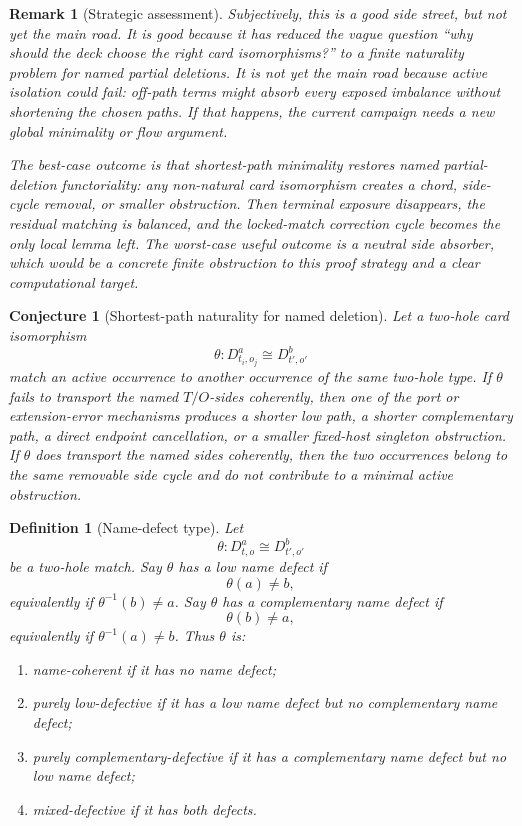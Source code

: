 \documentclass[11pt]{article}
\newtheorem{conjecture}{Conjecture}
\newtheorem{definition}{Definition}
\newtheorem{remark}{Remark}
\begin{document}
\begin{remark}[Strategic assessment]
Subjectively, this is a good side street, but not yet the main road.  It is
good because it has reduced the vague question ``why should the deck choose
the right card isomorphisms?'' to a finite naturality problem for named
partial deletions.  It is not yet the main road because active isolation could
fail: off-path terms might absorb every exposed imbalance without shortening
the chosen paths.  If that happens, the current campaign needs a new global
minimality or flow argument.

The best-case outcome is that shortest-path minimality restores named
partial-deletion functoriality: any non-natural card isomorphism creates a
chord, side-cycle removal, or smaller obstruction.  Then terminal exposure
disappears, the residual matching is balanced, and the locked-match correction
cycle becomes the only local lemma left.  The worst-case useful outcome is a
neutral side absorber, which would be a concrete finite obstruction to this
proof strategy and a clear computational target.
\end{remark}

\begin{conjecture}[Shortest-path naturality for named deletion]
Let a two-hole card isomorphism
\[
  \theta:D_{t_i,o_j}^a\cong D_{t',o'}^b
\]
match an active occurrence to another occurrence of the same two-hole type.
If \(\theta\) fails to transport the named \(T/O\)-sides coherently, then one
of the port or extension-error mechanisms produces a shorter low path, a
shorter complementary path, a direct endpoint cancellation, or a smaller
fixed-host singleton obstruction.  If \(\theta\) does transport the named
sides coherently, then the two occurrences belong to the same removable side
cycle and do not contribute to a minimal active obstruction.
\end{conjecture}

\begin{definition}[Name-defect type]
Let
\[
  \theta:D_{t,o}^a\cong D_{t',o'}^b
\]
be a two-hole match.  Say \(\theta\) has a low name defect if
\[
  \theta(a)\neq b,
\]
equivalently if \(\theta^{-1}(b)\neq a\).  Say \(\theta\) has a complementary
name defect if
\[
  \theta(b)\neq a,
\]
equivalently if \(\theta^{-1}(a)\neq b\).  Thus \(\theta\) is:
\begin{enumerate}[leftmargin=2em]
  \item name-coherent if it has no name defect;
  \item purely low-defective if it has a low name defect but no complementary
  name defect;
  \item purely complementary-defective if it has a complementary name defect
  but no low name defect;
  \item mixed-defective if it has both defects.
\end{enumerate}
\end{definition}
\end{document}
